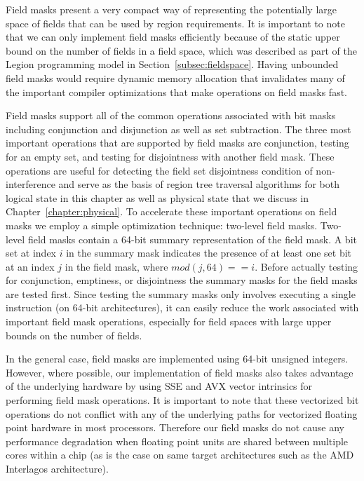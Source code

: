 Field masks present a very compact way of
representing the potentially large space of 
fields that can be used by region requirements.
It is important to note that we can only 
implement field masks efficiently because of 
the static upper bound on the number of fields
in a field space, which was described as part 
of the Legion programming model in 
Section~\ref{subsec:fieldspace}. Having unbounded
field masks would require dynamic memory allocation
that invalidates many of the important compiler
optimizations that make operations on field
masks fast.

Field masks support all of the common operations
associated with bit masks including conjunction
and disjunction as well as set subtraction. The
three most important operations that are supported
by field masks are conjunction, testing for an 
empty set, and testing for disjointness with 
another field mask. These operations are useful
for detecting the field set disjointness condition
of non-interference and serve as the basis of
region tree traversal algorithms for both logical
state in this chapter as well as physical state
that we discuss in Chapter~\ref{chapter:physical}.
To accelerate these important operations on field
masks we employ a simple optimization technique:
two-level field masks. Two-level field masks
contain a 64-bit summary representation of the 
field mask. A bit set at index $i$ in the summary
mask indicates the presence of at least one set
bit at an index $j$ in the field mask, where
$mod(j,64)==i$. Before actually
testing for conjunction, emptiness, or disjointness
the summary masks for the field masks are tested
first. Since testing the summary masks only involves 
executing a single instruction (on 64-bit architectures), 
it can easily reduce the work associated with important 
field mask operations, especially for field spaces
with large upper bounds on the number of fields.

In the general case, field masks are implemented
using 64-bit unsigned integers.  However, where
possible, our implementation of field masks also
takes advantage of the underlying hardware by
using SSE and AVX vector intrinsics for performing
field mask operations. It is important to note that
these vectorized bit operations do not conflict
with any of the underlying paths for vectorized 
floating point hardware in most processors. Therefore
our field masks do not cause any performance degradation
when floating point units are shared between 
multiple cores within a chip (as is the case on 
same target architectures such as the AMD 
Interlagos architecture).

